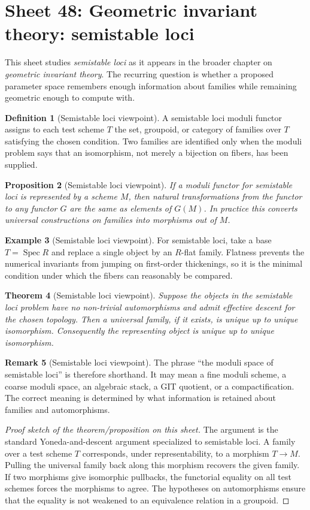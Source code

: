 \documentclass[11pt]{amsart}
\newtheorem{theorem}{Theorem}[section]
\newtheorem{proposition}[theorem]{Proposition}
\theoremstyle{definition}
\newtheorem{definition}[theorem]{Definition}
\newtheorem{example}[theorem]{Example}
\newtheorem{remark}[theorem]{Remark}
\newcommand{\Spec}{\operatorname{Spec}}
\begin{document}
\section{Sheet 48: Geometric invariant theory: semistable loci}
This sheet studies \emph{semistable loci} as it appears in the broader chapter on \emph{geometric invariant theory}.  The recurring question is whether a proposed parameter space remembers enough information about families while remaining geometric enough to compute with.
\begin{definition}[Semistable loci viewpoint]
A semistable loci moduli functor assigns to each test scheme $T$ the set, groupoid, or category of families over $T$ satisfying the chosen condition.  Two families are identified only when the moduli problem says that an isomorphism, not merely a bijection on fibers, has been supplied.
\end{definition}
\begin{proposition}[Semistable loci viewpoint]
If a moduli functor for semistable loci is represented by a scheme $M$, then natural transformations from the functor to any functor $G$ are the same as elements of $G(M)$.  In practice this converts universal constructions on families into morphisms out of $M$.
\end{proposition}
\begin{example}[Semistable loci viewpoint]
For semistable loci, take a base $T=\Spec R$ and replace a single object by an $R$-flat family.  Flatness prevents the numerical invariants from jumping on first-order thickenings, so it is the minimal condition under which the fibers can reasonably be compared.
\end{example}
\begin{theorem}[Semistable loci viewpoint]
Suppose the objects in the semistable loci problem have no non-trivial automorphisms and admit effective descent for the chosen topology.  Then a universal family, if it exists, is unique up to unique isomorphism.  Consequently the representing object is unique up to unique isomorphism.
\end{theorem}
\begin{remark}[Semistable loci viewpoint]
The phrase ``the moduli space of semistable loci'' is therefore shorthand.  It may mean a fine moduli scheme, a coarse moduli space, an algebraic stack, a GIT quotient, or a compactification.  The correct meaning is determined by what information is retained about families and automorphisms.
\end{remark}
\begin{proof}[Proof sketch of the theorem/proposition on this sheet]
The argument is the standard Yoneda-and-descent argument specialized to semistable loci.  A family over a test scheme $T$ corresponds, under representability, to a morphism $T\to M$.  Pulling the universal family back along this morphism recovers the given family.  If two morphisms give isomorphic pullbacks, the functorial equality on all test schemes forces the morphisms to agree.  The hypotheses on automorphisms ensure that the equality is not weakened to an equivalence relation in a groupoid.
\end{proof}
\end{document}
